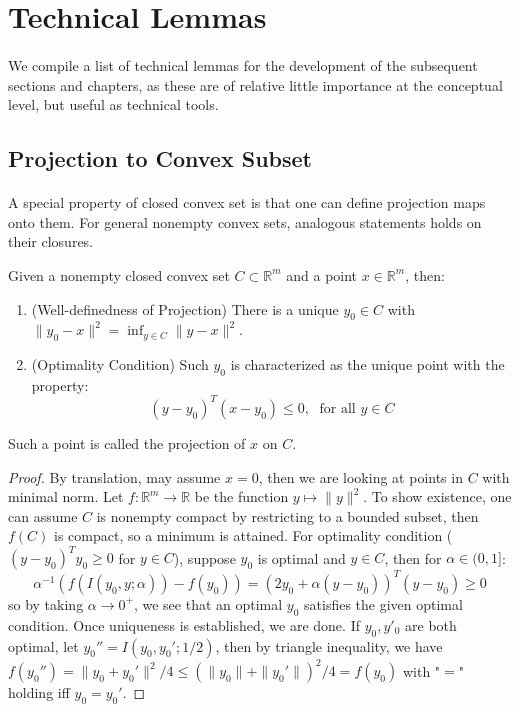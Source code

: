 \section{Technical Lemmas}
\label{sect:014}

\paragraph{}We compile a list of technical lemmas for the development of the subsequent sections and chapters, as these are of relative little importance at the conceptual level, but useful as technical tools.

\subsection{Projection to Convex Subset}
\paragraph{}A special property of closed convex set is that one can define projection maps onto them. For general nonempty convex sets, analogous statements holds on their closures.

\begin{lemm}\label{lemm:014-projection}
	Given a nonempty closed convex set $C\subset \mathbb{R}^m$ and a point $x\in \mathbb{R}^m$, then:
	\begin{enumerate}[label=(\alph*)]
		\item (Well-definedness of Projection) There is a unique $y_0\in C$ with $\|y_0-x\|^2=\inf_{y\in C}\|y-x\|^2$.
		\item (Optimality Condition) Such $y_0$ is characterized as the unique point with the property:
		      \[
			      (y-y_0)^T(x-y_0)\leq 0,\;\text{ for all }y\in C
		      \]
	\end{enumerate}
	Such a point is called the projection of $x$ on $C$.
\end{lemm}

\begin{proof}
	By translation, may assume $x=0$, then we are looking at points in $C$ with minimal norm. Let $f:\mathbb{R}^m\to \mathbb{R}$ be the function $y\mapsto \|y\|^2$. To show existence, one can assume $C$ is nonempty compact by restricting to a bounded subset, then $f(C)$ is compact, so a minimum is attained. For optimality condition ($(y-y_0)^Ty_0\geq 0$ for $y\in C$), suppose $y_0$ is optimal and $y\in C$, then for $\alpha \in(0,1]$:
	\[
		\alpha^{-1}\left(f(I(y_0,y; \alpha ))-f(y_0)\right) = (2y_0 + \alpha (y-y_0))^T(y-y_0)\geq0
	\]
	so by taking $\alpha \to 0^+$, we see that an optimal $y_0$ satisfies the given optimal condition. Once uniqueness is established, we are done. If $y_0,y'_0$ are both optimal, let $y_0''=I(y_0,y_0';1/2)$, then by triangle inequality, we have $f(y_0'')=\|y_0+y_0'\|^2/4\leq (\|y_0\|+\|y_0'\|)^2/4 =f(y_0)$ with "$=$" holding iff $y_0=y_0'$.
\end{proof}

